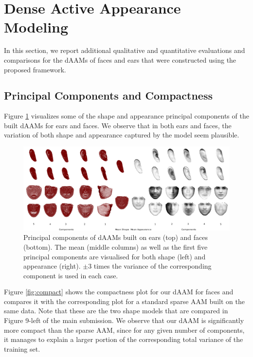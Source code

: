 \section{Dense Active Appearance Modeling}
\label{sec:daam}

In this section, we report additional qualitative and quantitative evaluations and comparisons for the dAAMs of faces and ears that were constructed using the proposed framework.



\subsection{Principal Components and Compactness}



Figure \ref{fig:pcamodel} visualizes some of the shape and appearance principal components of the built dAAMs for ears and faces. We observe that in both ears and faces, the variation of both shape and appearance captured by the model seem plausible.


\begin{figure}[!t]
\centering
\includegraphics[width=\textwidth]{Suplementory_Meterial/Models/models}
\caption{Principal components of dAAMs built on ears (top) and faces (bottom). The mean (middle columns) as well as the first five principal components are visualised for both shape (left) and appearance (right). $\pm 3$ times the variance of the corresponding component is used in each case.}
\label{fig:pcamodel}
\end{figure}


Figure \ref{fig:compact} shows the compactness plot for our dAAM for faces and compares it with the corresponding plot for a standard sparse AAM built on the same data. Note that these are the two shape models that are compared in Figure 9-left of the main submission. We observe that our dAAM is significantly more compact than the sparse AAM, since for any given number of components, it manages to explain a larger portion of the corresponding total variance of the training set. 


